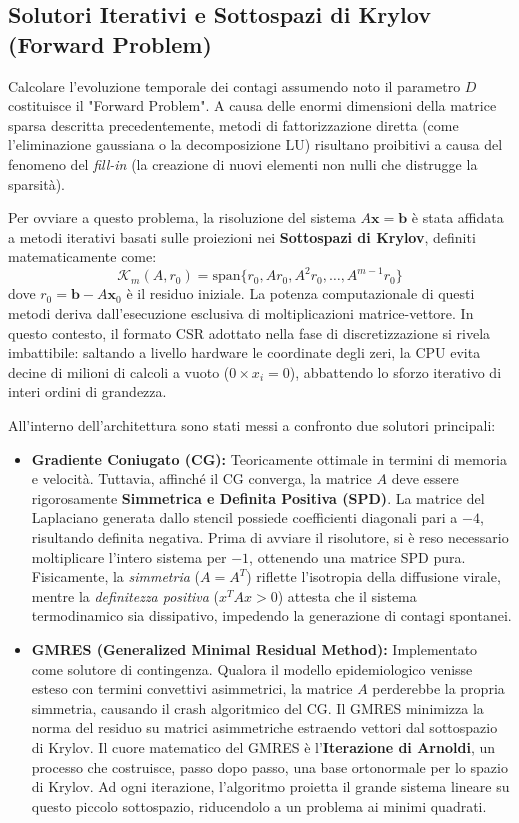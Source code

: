 \documentclass[12pt,a4paper]{article}
\begin{document}
\subsection{Solutori Iterativi e Sottospazi di Krylov (Forward Problem)}
Calcolare l'evoluzione temporale dei contagi assumendo noto il parametro $D$ costituisce il "Forward Problem".
A causa delle enormi dimensioni della matrice sparsa descritta precedentemente, metodi di fattorizzazione diretta (come l'eliminazione gaussiana o la decomposizione LU) risultano proibitivi a causa del fenomeno del \textit{fill-in} (la creazione di nuovi elementi non nulli che distrugge la sparsità).

Per ovviare a questo problema, la risoluzione del sistema $A \mathbf{x} = \mathbf{b}$ è stata affidata a metodi iterativi basati sulle proiezioni nei \textbf{Sottospazi di Krylov}, definiti matematicamente come:
\begin{equation}
    \mathcal{K}_m(A, r_0) = \text{span} \{ r_0, A r_0, A^2 r_0, \dots, A^{m-1} r_0 \}
\end{equation}
dove $r_0 = \mathbf{b} - A \mathbf{x}_0$ è il residuo iniziale. La potenza computazionale di questi metodi deriva dall'esecuzione esclusiva di moltiplicazioni matrice-vettore. In questo contesto, il formato CSR adottato nella fase di discretizzazione si rivela imbattibile: saltando a livello hardware le coordinate degli zeri, la CPU evita decine di milioni di calcoli a vuoto ($0 \times x_i = 0$), abbattendo lo sforzo iterativo di interi ordini di grandezza.

All'interno dell'architettura sono stati messi a confronto due solutori principali:
\begin{itemize}
    \item \textbf{Gradiente Coniugato (CG):} Teoricamente ottimale in termini di memoria e velocità. Tuttavia, affinché il CG converga, la matrice $A$ deve essere rigorosamente \textbf{Simmetrica e Definita Positiva (SPD)}. La matrice del Laplaciano generata dallo stencil possiede coefficienti diagonali pari a $-4$, risultando definita negativa. Prima di avviare il risolutore, si è reso necessario moltiplicare l'intero sistema per $-1$, ottenendo una matrice SPD pura. Fisicamente, la \textit{simmetria} ($A = A^T$) riflette l'isotropia della diffusione virale, mentre la \textit{definitezza positiva} ($x^T A x > 0$) attesta che il sistema termodinamico sia dissipativo, impedendo la generazione di contagi spontanei.
    \item \textbf{GMRES (Generalized Minimal Residual Method):} Implementato come solutore di contingenza. Qualora il modello epidemiologico venisse esteso con termini convettivi asimmetrici, la matrice $A$ perderebbe la propria simmetria, causando il crash algoritmico del CG. Il GMRES minimizza la norma del residuo su matrici asimmetriche estraendo vettori dal sottospazio di Krylov. Il cuore matematico del GMRES è l'\textbf{Iterazione di Arnoldi}, un processo che costruisce, passo dopo passo, una base ortonormale per lo spazio di Krylov. Ad ogni iterazione, l'algoritmo proietta il grande sistema lineare su questo piccolo sottospazio, riducendolo a un problema ai minimi quadrati.

\end{itemize}
\end{document}
